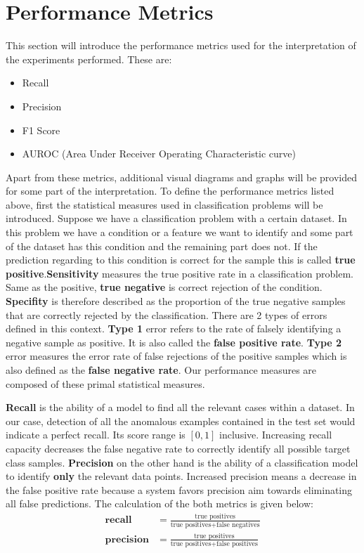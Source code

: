 \section{Performance Metrics}
\label{sec:perf_metric}
This section will introduce the performance metrics used for the interpretation of the experiments
performed. These are:
\begin{itemize}
	\item Recall
	\item Precision
	\item F1 Score
	\item AUROC (Area Under Receiver Operating Characteristic curve)
\end{itemize}
Apart from these metrics, additional visual diagrams and graphs will be provided for some part of
the interpretation. To define the performance metrics listed above, first the statistical measures
used in classification problems will be introduced. Suppose we have a classification problem with a
certain dataset. In this problem we have a condition or a feature we want to identify and  some part
of the dataset has this condition and the remaining part does not. If the prediction regarding to
this condition is correct for the sample this is called \textbf{true positive}.\textbf{Sensitivity}
measures the true positive rate in a classification problem. Same as the positive, \textbf{true
negative} is correct rejection of the condition. \textbf{Specifity} is therefore described as the
proportion of the true negative samples that are correctly rejected by the classification. There are
2 types of errors defined in this context. \textbf{Type 1} error refers to the rate of falsely
identifying a negative sample as positive. It is also called the \textbf{false positive rate}.
\textbf{Type 2} error measures the error rate of false rejections of the positive samples which is
also defined as the \textbf{false negative rate}. Our performance measures are composed of these
primal statistical measures. 

\textbf{Recall} is the ability of a model to find all the relevant cases within a dataset. In our
case, detection of all the anomalous examples contained in the test set would indicate a perfect
recall. Its score range is $[0,1]$ inclusive. Increasing recall capacity decreases the false
negative rate to correctly identify all possible target class samples. \textbf{Precision} on the
other hand is the ability of a classification model to identify \textbf{only} the relevant data
points. Increased precision means a decrease in the false positive rate because a system favors
precision aim towards eliminating all false predictions. The calculation of the both metrics is
given below:
\begin{align}
\textbf{recall} & = \frac{\text{true positives}}{\text{true positives} + \text{false negatives}} \\[5pt]
\textbf{precision} & = \frac{\text{true positives}}{\text{true positives} + \text{false positives}}
\end{align}

